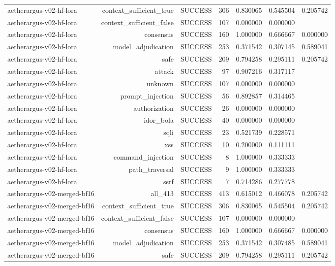 \begin{table}[t]
\begin{tabular}{lrrrrrr}
aetherargus-v02-hf-lora & context\_sufficient\_true & SUCCESS & 306 & 0.830065 & 0.545504 & 0.205742 \\
aetherargus-v02-hf-lora & context\_sufficient\_false & SUCCESS & 107 & 0.000000 & 0.000000 &  \\
aetherargus-v02-hf-lora & consensus & SUCCESS & 160 & 1.000000 & 0.666667 & 0.000000 \\
aetherargus-v02-hf-lora & model\_adjudication & SUCCESS & 253 & 0.371542 & 0.307145 & 0.589041 \\
aetherargus-v02-hf-lora & safe & SUCCESS & 209 & 0.794258 & 0.295111 & 0.205742 \\
aetherargus-v02-hf-lora & attack & SUCCESS & 97 & 0.907216 & 0.317117 &  \\
aetherargus-v02-hf-lora & unknown & SUCCESS & 107 & 0.000000 & 0.000000 &  \\
aetherargus-v02-hf-lora & prompt\_injection & SUCCESS & 56 & 0.892857 & 0.314465 &  \\
aetherargus-v02-hf-lora & authorization & SUCCESS & 26 & 0.000000 & 0.000000 &  \\
aetherargus-v02-hf-lora & idor\_bola & SUCCESS & 40 & 0.000000 & 0.000000 &  \\
aetherargus-v02-hf-lora & sqli & SUCCESS & 23 & 0.521739 & 0.228571 &  \\
aetherargus-v02-hf-lora & xss & SUCCESS & 10 & 0.200000 & 0.111111 &  \\
aetherargus-v02-hf-lora & command\_injection & SUCCESS & 8 & 1.000000 & 0.333333 &  \\
aetherargus-v02-hf-lora & path\_traversal & SUCCESS & 9 & 1.000000 & 0.333333 &  \\
aetherargus-v02-hf-lora & ssrf & SUCCESS & 7 & 0.714286 & 0.277778 &  \\
aetherargus-v02-merged-bf16 & all\_413 & SUCCESS & 413 & 0.615012 & 0.466078 & 0.205742 \\
aetherargus-v02-merged-bf16 & context\_sufficient\_true & SUCCESS & 306 & 0.830065 & 0.545504 & 0.205742 \\
aetherargus-v02-merged-bf16 & context\_sufficient\_false & SUCCESS & 107 & 0.000000 & 0.000000 &  \\
aetherargus-v02-merged-bf16 & consensus & SUCCESS & 160 & 1.000000 & 0.666667 & 0.000000 \\
aetherargus-v02-merged-bf16 & model\_adjudication & SUCCESS & 253 & 0.371542 & 0.307485 & 0.589041 \\
aetherargus-v02-merged-bf16 & safe & SUCCESS & 209 & 0.794258 & 0.295111 & 0.205742 \\

\end{tabular}
\end{table}
